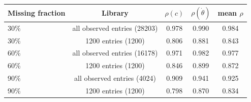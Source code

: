 \begin{tabular}{lcccc}
\toprule
Missing fraction & Library & $\rho(c)$ & $\rho(\dot\theta)$ & mean $\rho$\\
\midrule
30\% & all observed entries (28203) & 0.978 & 0.990 & 0.984\\
30\% & 1200 entries (1200) & 0.806 & 0.881 & 0.843\\
60\% & all observed entries (16178) & 0.971 & 0.982 & 0.977\\
60\% & 1200 entries (1200) & 0.846 & 0.899 & 0.872\\
90\% & all observed entries (4024) & 0.909 & 0.941 & 0.925\\
90\% & 1200 entries (1200) & 0.798 & 0.870 & 0.834\\
\bottomrule
\end{tabular}
